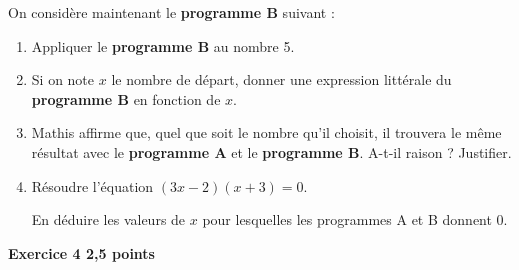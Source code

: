 \documentclass[11pt]{article}
\begin{document}
\newpage

On considère maintenant le \textbf{programme B} suivant :

\begin{center}
\end{center}

\begin{enumerate}[resume]
\item Appliquer le \textbf{programme B} au nombre 5.

\item Si on note $x$ le nombre de départ, donner une expression littérale du \textbf{programme B} en fonction de $x$.

\item Mathis affirme que, quel que soit le nombre qu'il choisit, il trouvera le même résultat avec le \textbf{programme A} et le \textbf{programme B}. A-t-il raison ? Justifier.

\item Résoudre l'équation $(3x-2)(x+3) = 0$.

En déduire les valeurs de $x$ pour lesquelles les programmes A et B donnent 0.
\end{enumerate}

\bigskip

\textbf{Exercice 4 \hfill 2,5 points}
\end{document}
